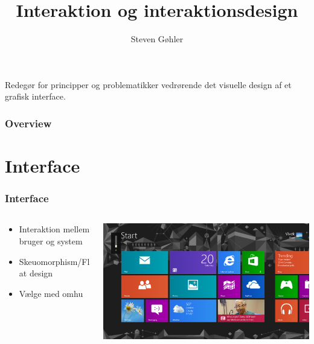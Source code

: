 \documentclass{beamer}
\title{Interaktion og interaktionsdesign}
\author{Steven Gøhler}
\begin{document}
\begin{frame}
\titlepage
Redegør for principper og problematikker vedrørende det visuelle design af et grafisk interface.
\end{frame}

\begin{frame}
  \frametitle{Overview}
  \tableofcontents
\end{frame}

\section{Interface}
\begin{frame}
\frametitle{Interface}
  \begin{columns}[T]
    \begin{column}{.5\textwidth}
	  \begin{itemize}
		\item Interaktion mellem bruger og system
		\item Skeuomorphism/Flat design
	    \item Vælge med omhu
	  \end{itemize}
    \end{column}
    \begin{column}{.5\textwidth}
      \includegraphics[width=\textwidth]{interface.png}
    \end{column}
  \end{columns}
\end{frame}
\end{document}

